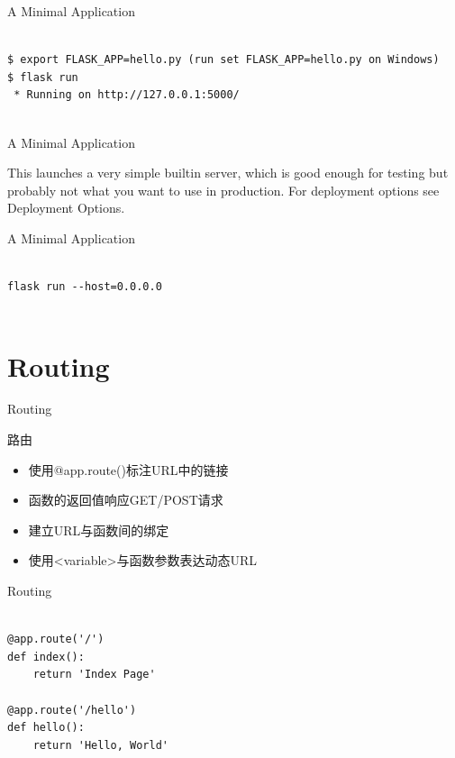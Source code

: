 \documentclass{beamer}
\begin{document}
\begin{frame}[t,fragile]{A Minimal Application}


\begin{verbatim}

$ export FLASK_APP=hello.py (run set FLASK_APP=hello.py on Windows)
$ flask run
 * Running on http://127.0.0.1:5000/


\end{verbatim}


\end{frame}


\begin{frame}[t]{A Minimal Application}

This launches a very simple builtin server, which is good enough for testing
but probably not what you want to use in production. For deployment options see
Deployment Options.

\end{frame}




\begin{frame}[t,fragile]{A Minimal Application}


\begin{verbatim}

flask run --host=0.0.0.0


\end{verbatim}


\end{frame}


\section{Routing}

\begin{frame}[t]{Routing}

	\begin{block}
		{路由}
		\begin{itemize}
			\item 使用@app.route()标注URL中的链接
			\item 函数的返回值响应GET/POST请求
			\item 建立URL与函数间的绑定
			\item 使用<variable>与函数参数表达动态URL
		\end{itemize}
		
	\end{block}

\end{frame}


\begin{frame}[t,fragile]{Routing}


\begin{verbatim}

@app.route('/')
def index():
    return 'Index Page'

@app.route('/hello')
def hello():
    return 'Hello, World'


\end{verbatim}


\end{frame}
\end{document}
